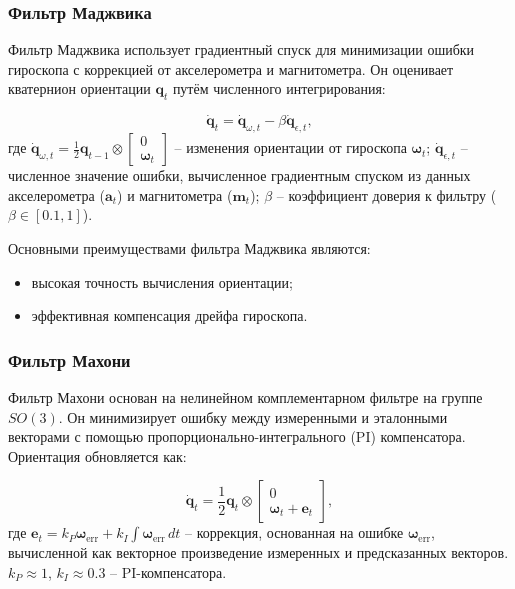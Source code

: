 \subsubsection{Фильтр Маджвика}

Фильтр Маджвика использует градиентный спуск для минимизации ошибки гироскопа 
с коррекцией от акселерометра и магнитометра. Он оценивает кватернион ориентации
\(\mathbf{q}_t\) путём численного интегрирования:

\begin{equation}
    \dot{\mathbf{q}}_t = \dot{\mathbf{q}}_{\omega, t} - \beta \dot{\mathbf{q}}_{\epsilon, t},
\end{equation}
где
    \(\dot{\mathbf{q}}_{\omega, t} = \frac{1}{2} \mathbf{q}_{t-1} \otimes \begin{bmatrix} 0 \\ 
    \boldsymbol{\omega}_t \end{bmatrix}\) -- изменения ориентации от гироскопа \(\boldsymbol{\omega}_t\);
    \(\dot{\mathbf{q}}_{\epsilon, t}\) -- 
    численное значение ошибки, вычисленное градиентным спуском из данных акселерометра 
    (\(\mathbf{a}_t\)) и магнитометра (\(\mathbf{m}_t\));
    \(\beta\) -- коэффициент доверия к фильтру ($\beta \in [0.1, 1]$).

Основными преимуществами фильтра Маджвика являются:
\begin{itemize}
	\item высокая точность вычисления ориентации;
	\item эффективная компенсация дрейфа гироскопа.
\end{itemize}

\subsubsection{Фильтр Махони}

Фильтр Махони основан на нелинейном комплементарном фильтре на группе \(SO(3)\).
Он минимизирует ошибку между измеренными и эталонными векторами с помощью пропорционально-интегрального (PI)
компенсатора. Ориентация обновляется как:

\begin{equation}
    \dot{\mathbf{q}}_t = \frac{1}{2} \mathbf{q}_t \otimes \begin{bmatrix} 0 \\ \boldsymbol{\omega}_t + \mathbf{e}_t \end{bmatrix},
\end{equation}
где
    \(\mathbf{e}_t = k_P \boldsymbol{\omega}_{\text{err}} + k_I \int \boldsymbol{\omega}_{\text{err}} \, dt\) --
    коррекция, основанная на ошибке \(\boldsymbol{\omega}_{\text{err}}\), 
    вычисленной как векторное произведение измеренных и предсказанных векторов.
    \(k_P \approx 1\), \(k_I \approx 0.3\) -- PI-компенсатора.

